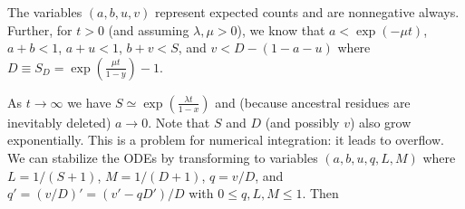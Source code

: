 \documentclass{article}
\begin{document}
The variables $(a,b,u,v)$ represent expected counts and are nonnegative always.
Further, for $t>0$ (and assuming $\lambda,\mu > 0$), we know that
$a < \exp(-\mu t)$, $a+b<1$, $a+u<1$, $b+v<S$, and $v<D-(1-a-u)$
where $D \equiv S_D = \exp\left(\frac{\mu t}{1-y}\right) - 1$.

As $t \to \infty$ we have $S \simeq \exp\left(\frac{\lambda t}{1-x}\right)$ and (because ancestral residues are inevitably deleted) $a \to 0$.
Note that $S$ and $D$ (and possibly $v$) also grow exponentially. This is a problem for numerical integration: it leads to overflow.
We can stabilize the ODEs by transforming to variables $(a,b,u,q,L,M)$ where $L=1/(S+1)$, $M=1/(D+1)$, $q=v/D$, and $q'=(v/D)'=(v'-qD')/D$
with $0 \leq q,L,M \leq 1$.
Then

% 
% 
% 
\end{document}

